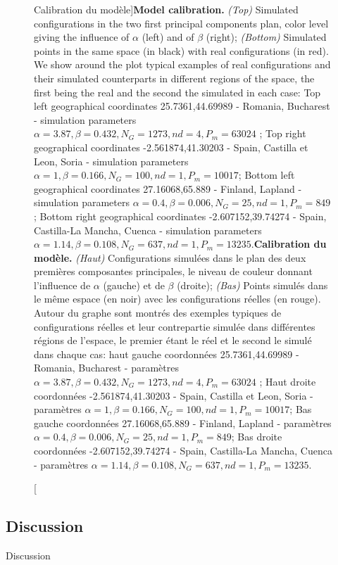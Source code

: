 \begin{figure}
\caption[Model calibration][Calibration du modèle]{\textbf{Model calibration.} \textit{(Top)} Simulated configurations in the two first principal components plan, color level giving the influence of $\alpha$ (left) and of $\beta$ (right); \textit{(Bottom)} Simulated points in the same space (in black) with real configurations (in red). We show around the plot typical examples of real configurations and their simulated counterparts in different regions of the space, the first being the real and the second the simulated in each case: Top left geographical coordinates 25.7361,44.69989 - Romania, Bucharest - simulation parameters $\alpha=3.87,\beta=0.432,N_G=1273,nd=4,P_m=63024$ ; Top right geographical coordinates -2.561874,41.30203 - Spain, Castilla et Leon, Soria - simulation parameters $\alpha=1,\beta=0.166,N_G=100,nd=1,P_m=10017$; Bottom left geographical coordinates 27.16068,65.889 - Finland, Lapland - simulation parameters $\alpha=0.4,\beta=0.006,N_G=25,nd=1,P_m=849$; Bottom right geographical coordinates -2.607152,39.74274 - Spain, Castilla-La Mancha, Cuenca - simulation parameters $\alpha=1.14,\beta=0.108,N_G=637,nd=1,P_m=13235$.\label{fig:densitycalib}}{\textbf{Calibration du modèle.} \textit{(Haut)} Configurations simulées dans le plan des deux premières composantes principales, le niveau de couleur donnant l'influence de $\alpha$ (gauche) et de $\beta$ (droite); \textit{(Bas)} Points simulés dans le même espace (en noir) avec les configurations réelles (en rouge). Autour du graphe sont montrés des exemples typiques de configurations réelles et leur contrepartie simulée dans différentes régions de l'espace, le premier étant le réel et le second le simulé dans chaque cas: haut gauche coordonnées 25.7361,44.69989 - Romania, Bucharest - paramètres $\alpha=3.87,\beta=0.432,N_G=1273,nd=4,P_m=63024$ ; Haut droite coordonnées -2.561874,41.30203 - Spain, Castilla et Leon, Soria - paramètres $\alpha=1,\beta=0.166,N_G=100,nd=1,P_m=10017$; Bas gauche coordonnées 27.16068,65.889 - Finland, Lapland - paramètres $\alpha=0.4,\beta=0.006,N_G=25,nd=1,P_m=849$; Bas droite coordonnées -2.607152,39.74274 - Spain, Castilla-La Mancha, Cuenca - paramètres $\alpha=1.14,\beta=0.108,N_G=637,nd=1,P_m=13235$.\label{fig:densitycalib}}
\end{figure}








\subsection{Discussion}{Discussion}




